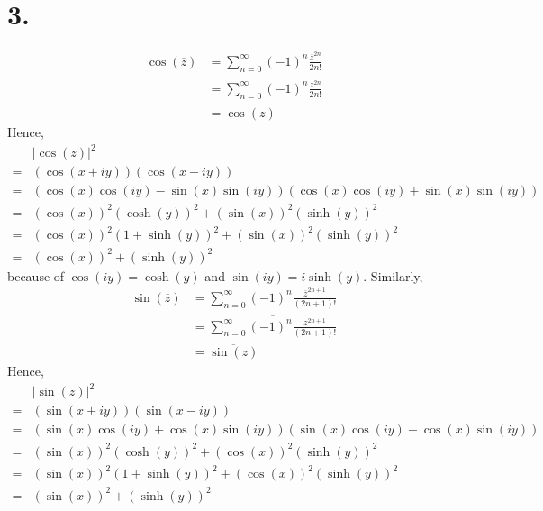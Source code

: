 \documentclass[11pt]{article}
\begin{document}
\section*{3.}
\begin{equation*}
    \begin{aligned}
        \cos(\overline{z})&= \sum_{n = 0}^\infty (-1)^n \frac{\overline{z}^{2n}}{2n!} \\
        &= \overline{\sum_{n = 0}^\infty (-1)^n \frac{z^{2n}}{2n!}} \\
        &= \overline{\cos(z)}
    \end{aligned}
\end{equation*}
Hence, 
\begin{equation*}
    \begin{aligned}
        &|\cos(z)|^2 \\
        =& (\cos(x+iy))(\cos(x-iy)) \\
        =& (\cos(x) \cos(iy) - \sin(x)\sin(iy)) (\cos(x) \cos(iy) + \sin(x)\sin(iy)) \\
        =& (\cos(x))^2(\cosh(y))^2 + (\sin(x))^2 (\sinh(y))^2 \\
        =& (\cos(x))^2(1 + \sinh(y))^2 + (\sin(x))^2 (\sinh(y))^2 \\
        =& (\cos(x))^2 + (\sinh(y))^2
    \end{aligned}
\end{equation*}
because of $\cos(iy) = \cosh(y)$ and $\sin(iy) = i \sinh(y)$. Similarly, 
\begin{equation*}
    \begin{aligned}
        \sin(\overline{z})&= \sum_{n = 0}^\infty (-1)^n \frac{\overline{z}^{2n+1}}{(2n+1)!} \\
        &= \overline{\sum_{n = 0}^\infty (-1)^n \frac{z^{2n+1}}{(2n+1)!}} \\
        &= \overline{\sin(z)}
    \end{aligned}
\end{equation*}
Hence, 
\begin{equation*}
    \begin{aligned}
        &|\sin(z)|^2 \\
        =& (\sin(x+iy))(\sin(x-iy)) \\
        =& (\sin(x) \cos(iy) + \cos(x)\sin(iy)) (\sin(x) \cos(iy) - \cos(x)\sin(iy)) \\
        =& (\sin(x))^2(\cosh(y))^2 + (\cos(x))^2 (\sinh(y))^2 \\
        =& (\sin(x))^2(1 + \sinh(y))^2 + (\cos(x))^2 (\sinh(y))^2 \\
        =& (\sin(x))^2 + (\sinh(y))^2
    \end{aligned}
\end{equation*}
\end{document}
